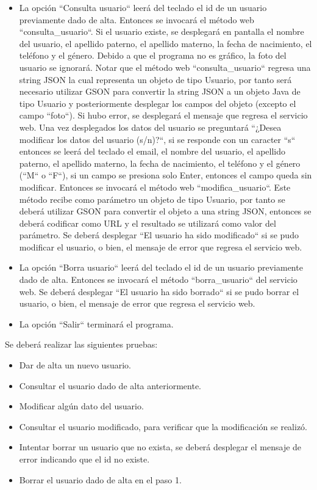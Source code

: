 \documentclass[11pt]{article}
\begin{document}
\begin{itemize}
			\item La opción ``Consulta usuario`` leerá del teclado el id de un usuario previamente dado de alta. Entonces se invocará el método web ``consulta\_usuario``. Si el usuario existe, se desplegará en pantalla el nombre del usuario, el apellido paterno, el apellido materno, la fecha de nacimiento, el teléfono y el género. Debido a que el programa no es gráfico, la foto del usuario se ignorará. Notar que el método web ``consulta\_usuario`` regresa una string JSON la cual representa un objeto de tipo Usuario, por tanto será necesario utilizar GSON para convertir la string JSON a un objeto Java de tipo Usuario y posteriormente desplegar los campos del objeto (excepto el campo ``foto``). Si hubo error, se desplegará el mensaje que regresa el servicio web. Una vez desplegados los datos del usuario se preguntará ``¿Desea modificar los datos del usuario (s/n)?``, si se responde con un caracter ``s`` entonces se leerá del teclado el email, el nombre del usuario, el apellido paterno, el apellido materno, la fecha de nacimiento, el teléfono y el género (``M`` o ``F``), si un campo se presiona solo Enter, entonces el campo queda sin modificar.  Entonces se invocará el método web ``modifica\_usuario``. Este método recibe como parámetro un objeto de tipo Usuario, por tanto se deberá utilizar GSON para convertir el objeto a una string JSON, entonces se deberá codificar como URL y el resultado se utilizará como valor del parámetro. Se deberá desplegar ``El usuario ha sido modificado`` si se pudo modificar el usuario, o bien, el mensaje de error que regresa el servicio web.
			\item La opción ``Borra usuario`` leerá del teclado el id de un usuario previamente dado de alta. Entonces se invocará el método ``borra\_usuario`` del servicio web. Se deberá desplegar ``El usuario ha sido borrado`` si se pudo borrar el usuario, o bien, el mensaje de error que regresa el servicio web.
			\item La opción ``Salir`` terminará el programa.
		\end{itemize}
Se deberá realizar las siguientes pruebas:
\begin{itemize}
			\item Dar de alta un nuevo usuario.
			\item Consultar el usuario dado de alta anteriormente.
			\item Modificar algún dato del usuario.
			\item Consultar el usuario modificado, para verificar que la modificación se realizó.
			\item Intentar borrar un usuario que no exista, se deberá desplegar el mensaje de error indicando que el id no existe.
			\item Borrar el usuario dado de alta en el paso 1.
		\end{itemize}
\end{document}
